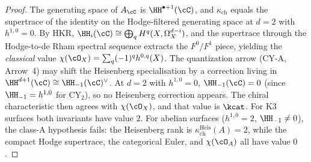 \begin{proof}
The generating space of $A_\cC$ is $\HH^{\bullet+1}(\cC)$, and
$\kappa_{\mathrm{ch}}$ equals the supertrace of the identity on the
Hodge-filtered generating space at $d = 2$ with $h^{1,0} = 0$. By HKR,
$\HH_i(\cC) \cong \bigoplus_q H^q(X, \Omega^{d-i}_X)$, and the
supertrace through the Hodge-to-de Rham spectral sequence extracts the
$F^0/F^1$ piece, yielding the \emph{classical} value
$\chi(\cO_X) = \sum_q (-1)^q h^{0,q}(X)$. The quantization arrow (CY-A,
Arrow~4) may shift the Heisenberg specialisation by a correction living
in $\HH^{d+1}(\cC) \cong \HH_{-1}(\cC)^\vee$. At $d = 2$ with
$h^{1,0} = 0$, $\HH_{-1}(\cC) = 0$ (since $\HH_{-1} = h^{1,0}$ for
CY$_2$), so no Heisenberg correction appears. The chiral characteristic
then agrees with $\chi(\cO_X)$, and that value is $\kcat$. For K3
surfaces both invariants have value $2$. For abelian surfaces
($h^{1,0} = 2$, $\HH_{-1} \neq 0$), the class-A hypothesis fails: the
Heisenberg rank is $\kappa_{\mathrm{ch}}^{\mathrm{Heis}}(A) = 2$, while
the compact Hodge supertrace, the categorical Euler, and $\chi(\cO_A)$
all have value $0$.
\end{proof}

